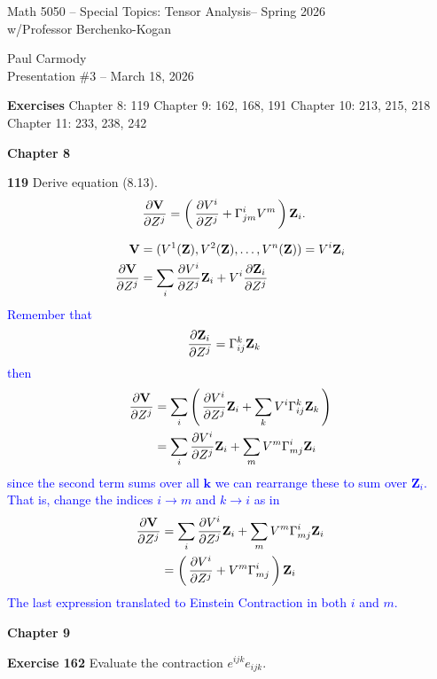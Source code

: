 \documentclass[12pt,a4paper]{report}
\newcommand{\CLASSNAME}{Math 5050 -- Special Topics: Tensor Analysis}
\newcommand{\STUDENTNAME}{Paul Carmody}
\newcommand{\ASSIGNMENT}{Presentation \#3 }
\newcommand{\DUEDATE}{March 18, 2026}
\newcommand{\PROFESSOR}{Professor Berchenko-Kogan}
\newcommand{\SEMESTER}{Spring 2026}
\newcommand{\BLUE}[1]{\textcolor{blue}{#1}}
\newcommand{\COFF}[3]{\Gamma^{#1}_{{#2}{#3}}}
\newcommand{\VK}[1]{\textbf{#1}}
\begin{document}
\begin{center}
	\Large{\CLASSNAME -- \SEMESTER} \\
	\large{ w/\PROFESSOR}
\end{center}
\begin{center}
	\STUDENTNAME \\
	\ASSIGNMENT -- \DUEDATE\\
\end{center} 

\textbf{\large{Exercises}}
Chapter 8: 119
Chapter 9: 162, 168, 191
Chapter 10: 213, 215, 218
Chapter 11: 233, 238, 242

\HLINE
\textbf{Chapter 8}

\textbf{119} Derive equation (8.13).
\begin{align*}
	\PART{\VK{V}}{Z^j} &= \PAREN{\PART{V^i}{Z^j}+\COFF{i}{j}{m}V^m}\VK{Z}_i.
\end{align*}

\BLUE{\begin{align*}
	\VK{V} &= (V^1(\VK{Z}), V^2(\VK{Z}), \dots, V^n(\VK{Z})) = V^i\VK{Z}_i  \\
	\PART{\VK{V}}{Z^j} &= \sum_i \PART{V^i}{Z^j}\VK{Z}_i + V^i \PART{\VK{Z}_i}{Z^j} 
\end{align*}Remember that 
\begin{align*}
	\PART{\VK{Z}_i}{Z^j} &= \COFF{k}{i}{j}\VK{Z}_k
\end{align*}then
\begin{align*}
	\PART{\VK{V}}{Z^j} &= \sum_i \PAREN{ \PART{V^i}{Z^j}\VK{Z}_i + \sum_k V^i \COFF{k}{i}{j}\VK{Z}_k } \\
	&= \sum_i\PART{V^i}{Z^j}\VK{Z}_i + \sum_m V^m \COFF{i}{m}{j}\VK{Z}_i 
\end{align*}since the second term sums over all $\VK{k}$ we can rearrange these to sum over $\VK{Z}_i$.  That is, change the indices $i\to m$ and $k \to i$ as in 
\begin{align*}
	\PART{\VK{V}}{Z^j} &= \sum_i\PART{V^i}{Z^j}\VK{Z}_i + \sum_m V^m \COFF{i}{m}{j}\VK{Z}_i \\
	&= \PAREN{\PART{V^i}{Z^j} + V^m \COFF{i}{m}{j}}\VK{Z}_i 
\end{align*}The last expression translated to Einstein Contraction in both $i$ and $m$.
}

\HLINE
\textbf{Chapter 9}

 \textbf{Exercise 162} Evaluate the contraction $e^{ijk}e_{ijk}$.
\end{document}
